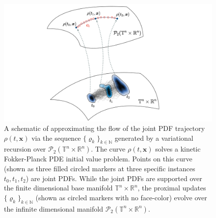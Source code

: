 \documentclass[10pt,twocolumn]{IEEEtran}
\begin{document}
\begin{figure}[tb]
\centering
\includegraphics[width=0.7\linewidth]{ProxSchmatic.pdf}
\caption{\small{A schematic of approximating the flow of the joint PDF trajectory $\rho(t,\bm{x})$ via the sequence $\{\varrho_{k}\}_{k\in\mathbb{N}}$ generated by a variational recursion over $\mathcal{P}_{2}\left(\mathbb{T}^{n}\times\mathbb{R}^{n}\right)$. The curve $\rho(t,\bm{x})$ solves a kinetic Fokker-Planck PDE initial value problem. Points on this curve (shown as three filled circled markers at three specific instances $t_0,t_1,t_2$) are joint PDFs. While the joint PDFs are supported over the finite dimensional base manifold $\mathbb{T}^{n}\times\mathbb{R}^{n}$, the proximal updates $\{\varrho_{k}\}_{k\in\mathbb{N}}$ (shown as circled markers with no face-color) evolve over the infinite dimensional manifold $\mathcal{P}_{2}\left(\mathbb{T}^{n}\times\mathbb{R}^{n}\right)$.}}
\vspace*{-0.2in}
\label{fig:ProxSchematic}
\end{figure}
\end{document}
